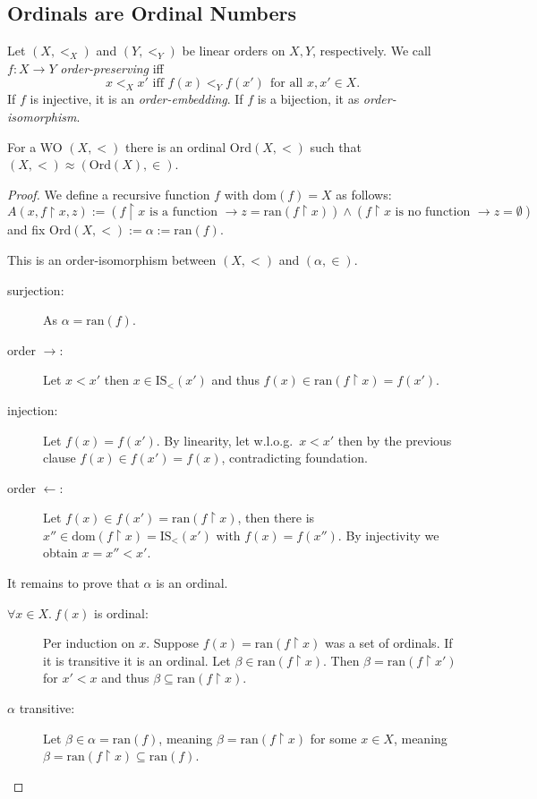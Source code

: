 \documentclass{whrartcl}
\newcommand{\dom}{\text{dom}}
\newcommand{\ran}{\text{ran}}
\newcommand{\IS}{\text{IS}}
\newcommand{\ord}{\text{Ord}}
\newcommand{\uh}{\upharpoonright}
\begin{document}
\subsection{Ordinals are Ordinal Numbers}

\begin{definition}
  Let $(X, <_X)$ and $(Y, <_Y)$ be linear orders on $X, Y$, respectively. We call $f : X
  \to Y$ \emph{order-preserving} iff
  \[
    x <_X x' \text{ iff } f(x) <_Y f(x') ~~\text{for all } x, x' \in X.
  \]
  If $f$ is injective, it is an \emph{order-embedding}. If $f$ is a bijection,
  it as \emph{order-isomorphism}.
\end{definition}

\begin{theorem}
  For a WO $(X, <)$ there is an ordinal $\ord(X, <)$ such that
  $(X, <) \approx (\ord(X), \in)$.
\end{theorem}
\begin{proof}
  We define a recursive function $f$ with $\dom(f) = X$ as follows:
  \[
    A(x, f \uh x, z) := (f \uh x \text{ is a function } \to z = \ran(f \uh x))
    \wedge (f \uh x \text{ is no function } \to z = \emptyset)
  \]
  and fix $\ord(X, <) := \alpha := \ran(f)$.

  This is an order-isomorphism between $(X, <)$ and $(\alpha, \in)$.
  \begin{description}
  \item[surjection:] As $\alpha = \ran(f)$.
  \item[order $\to$:] Let $x < x'$ then $x \in \IS_<(x')$ and thus $f(x) \in
    \ran(f \uh x) = f(x')$.
  \item[injection:] Let $f(x) = f(x')$. By linearity, let w.l.o.g.\ $x < x'$
    then by the previous clause $f(x) \in f(x') = f(x)$, contradicting foundation.
  \item[order $\leftarrow$:] Let $f(x) \in f(x') = \ran(f \uh x)$, then there is
    $x'' \in \dom(f \uh x) = \IS_<(x')$ with $f(x) = f(x'')$. By injectivity we
    obtain $x = x'' < x'$.
  \end{description}

  It remains to prove that $\alpha$ is an ordinal.
  \begin{description}
  \item[$\forall x \in X.~f(x)$ is ordinal:] Per induction on $x$. Suppose $f(x) = \ran(f \uh x)$ was a
    set of ordinals. If it is transitive it is an ordinal. Let $\beta
    \in \ran(f \uh x)$. Then $\beta = \ran(f \uh x')$ for $x' < x$ and thus
    $\beta \subseteq \ran(f \uh x)$.
  \item[$\alpha$ transitive:] Let $\beta \in \alpha = \ran(f)$, meaning $\beta = \ran(f
    \uh x)$ for some $x \in X$, meaning $\beta = \ran(f \uh x) \subseteq \ran(f)$.
  \end{description}
\end{proof}
\end{document}
